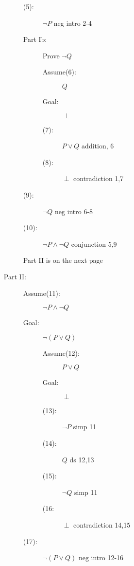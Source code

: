\documentclass[12pt]{article}
\begin{document}
\begin{enumerate}
\begin{description}
\begin{description}
\item[(5):]  $\neg P$ neg intro 2-4
\item[Part Ib:]  Prove $\neg Q$
\begin{description}
\item[Assume(6):]  $Q$

\item[Goal:]  $\perp$

\item[(7):] $P \vee Q$  addition, 6

\item[(8):]  $\perp$ contradiction 1,7

\end{description}
\item[(9):]  $\neg Q$ neg intro 6-8

\item[(10):]  $\neg P \wedge \neg Q$  conjunction 5,9
\end{description}

Part II is on the next page

\newpage

\item[Part II:]

\begin{description}

\item[Assume(11):]  $\neg P \wedge \neg Q$

\item[Goal:]  $\neg(P \vee Q)$

\begin{description}

\item[Assume(12):]  $P \vee Q$

\item[Goal:]  $\perp$

\item[(13):]  $\neg P$ simp 11

\item[(14):]  $Q$  ds 12,13

\item [(15):]  $\neg Q$  simp 11

\item[(16:]  $\perp$  contradiction 14,15

\end{description}

\item[(17):]  $\neg(P \vee Q)$ neg intro 12-16

\end{description}


\end{description}
\end{enumerate}
\end{document}
